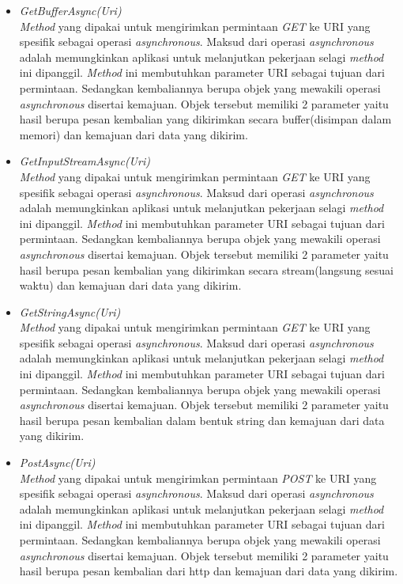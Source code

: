 \begin{itemize}
	\item \textit{GetBufferAsync(Uri)} \\
	\textit{Method} yang dipakai untuk mengirimkan permintaan \textit{GET} ke URI yang spesifik sebagai operasi \textit{asynchronous}. Maksud dari operasi \textit{asynchronous} adalah memungkinkan aplikasi untuk melanjutkan pekerjaan selagi \textit{method} ini dipanggil\footnotemark[2]. \textit{Method} ini membutuhkan parameter URI sebagai tujuan dari permintaan. Sedangkan kembaliannya berupa objek yang mewakili operasi \textit{asynchronous} disertai kemajuan. Objek tersebut memiliki 2 parameter yaitu hasil berupa pesan kembalian yang dikirimkan secara buffer(disimpan dalam memori) dan kemajuan dari data yang dikirim.
	\item \textit{GetInputStreamAsync(Uri)} \\
	\textit{Method} yang dipakai untuk mengirimkan permintaan \textit{GET} ke URI yang spesifik sebagai operasi \textit{asynchronous}. Maksud dari operasi \textit{asynchronous} adalah memungkinkan aplikasi untuk melanjutkan pekerjaan selagi \textit{method} ini dipanggil\footnotemark[2]. \textit{Method} ini membutuhkan parameter URI sebagai tujuan dari permintaan. Sedangkan kembaliannya berupa objek yang mewakili operasi \textit{asynchronous} disertai kemajuan. Objek tersebut memiliki 2 parameter yaitu hasil berupa pesan kembalian yang dikirimkan secara stream(langsung sesuai waktu) dan kemajuan dari data yang dikirim.
	\item \textit{GetStringAsync(Uri)} \\
	\textit{Method} yang dipakai untuk mengirimkan permintaan \textit{GET} ke URI yang spesifik sebagai operasi \textit{asynchronous}. Maksud dari operasi \textit{asynchronous} adalah memungkinkan aplikasi untuk melanjutkan pekerjaan selagi \textit{method} ini dipanggil\footnotemark[2]. \textit{Method} ini membutuhkan parameter URI sebagai tujuan dari permintaan. Sedangkan kembaliannya berupa objek yang mewakili operasi \textit{asynchronous} disertai kemajuan. Objek tersebut memiliki 2 parameter yaitu hasil berupa pesan kembalian dalam bentuk string dan kemajuan dari data yang dikirim.
	\item \textit{PostAsync(Uri)} \\
	\textit{Method} yang dipakai untuk mengirimkan permintaan \textit{POST} ke URI yang spesifik sebagai operasi \textit{asynchronous}. Maksud dari operasi \textit{asynchronous} adalah memungkinkan aplikasi untuk melanjutkan pekerjaan selagi \textit{method} ini dipanggil\footnotemark[2]. \textit{Method} ini membutuhkan parameter URI sebagai tujuan dari permintaan. Sedangkan kembaliannya berupa objek yang mewakili operasi \textit{asynchronous} disertai kemajuan. Objek tersebut memiliki 2 parameter yaitu hasil berupa pesan kembalian dari http dan kemajuan dari data yang dikirim.

\end{itemize}
